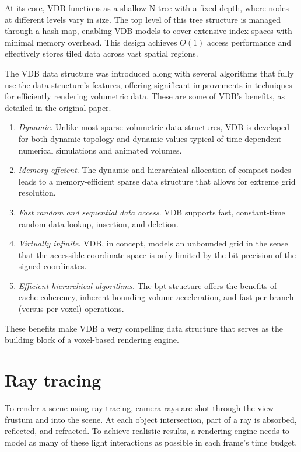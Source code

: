 At its core, VDB functions as a shallow N-tree with a fixed depth, where nodes at different levels vary in size. The top level of this tree structure is managed through a hash map, enabling VDB models to cover extensive index spaces with minimal memory overhead. This design achieves $O(1)$ access performance and effectively stores tiled data across vast spatial regions.

The VDB data structure was introduced along with several algorithms that fully use the data structure's features, offering significant improvements in techniques for efficiently rendering volumetric data. These are some of VDB's benefits, as detailed in the original paper.
\begin{enumerate}
  \item \emph{Dynamic}. Unlike most sparse volumetric data structures, VDB is developed for both dynamic topology and dynamic values typical of time-dependent numerical simulations and animated volumes.
  \item \emph{Memory effcient}. The dynamic and hierarchical allocation of compact nodes leads to a memory-efficient sparse data structure that allows for extreme grid resolution.
  \item \emph{Fast random and sequential data access}. VDB supports fast, constant-time random data lookup, insertion, and deletion.
  \item \emph{Virtually infinite}. VDB, in concept, models an unbounded grid in the sense that the accessible coordinate space is only limited by the bit-precision of the signed coordinates.
  \item \emph{Efficient hierarchical algorithms.} The \acrshort{bpt} structure offers the benefits of cache coherency, inherent bounding-volume acceleration, and fast per-branch (versus per-voxel) operations.
\end{enumerate}
These benefits make VDB a very compelling data structure that serves as the building block of a voxel-based rendering engine.

\section{Ray tracing}
To render a scene using ray tracing, camera rays are shot through the view frustum and into the scene. At each object intersection, part of a ray is absorbed, reflected, and refracted. To achieve realistic results, a rendering engine needs to model as many of these light interactions as possible in each frame's time budget.

